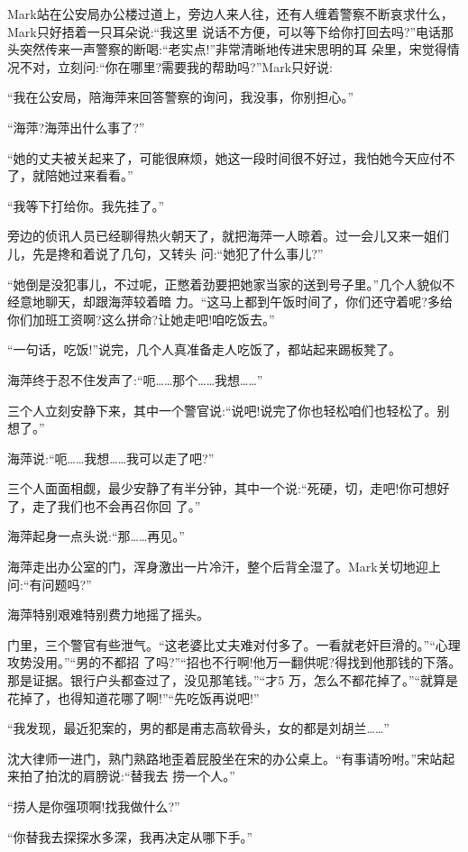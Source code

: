 \documentclass[11pt,a4paper,onecolumn]{article}
\begin{document}
Mark站在公安局办公楼过道上，旁边人来人往，还有人缠着警察不断哀求什么，Mark只好捂着一只耳朵说:``我这里
说话不方便，可以等下给你打回去吗?''电话那头突然传来一声警察的断喝:``老实点!''非常清晰地传进宋思明的耳
朵里，宋觉得情况不对，立刻问:``你在哪里?需要我的帮助吗?''Mark只好说:

``我在公安局，陪海萍来回答警察的询问，我没事，你别担心。''

``海萍?海萍出什么事了?''

``她的丈夫被关起来了，可能很麻烦，她这一段时间很不好过，我怕她今天应付不了，就陪她过来看看。''

``我等下打给你。我先挂了。''

旁边的侦讯人员已经聊得热火朝天了，就把海萍一人晾着。过一会儿又来一姐们儿，先是搀和着说了几句，又转头
问:``她犯了什么事儿?''

``她倒是没犯事儿，不过呢，正憋着劲要把她家当家的送到号子里。''几个人貌似不经意地聊天，却跟海萍较着暗
力。``这马上都到午饭时间了，你们还守着呢?多给你们加班工资啊?这么拼命?让她走吧!咱吃饭去。''

``一句话，吃饭!''说完，几个人真准备走人吃饭了，都站起来踢板凳了。

海萍终于忍不住发声了:``呃……那个……我想……''

三个人立刻安静下来，其中一个警官说:``说吧!说完了你也轻松咱们也轻松了。别想了。''

海萍说:``呃……我想……我可以走了吧?''

三个人面面相觑，最少安静了有半分钟，其中一个说:``死硬，切，走吧!你可想好了，走了我们也不会再召你回
了。''

海萍起身一点头说:``那……再见。''

海萍走出办公室的门，浑身激出一片冷汗，整个后背全湿了。Mark关切地迎上问:``有问题吗?''

海萍特别艰难特别费力地摇了摇头。

门里，三个警官有些泄气。``这老婆比丈夫难对付多了。一看就老奸巨滑的。''``心理攻势没用。''``男的不都招
了吗?''``招也不行啊!他万一翻供呢?得找到他那钱的下落。那是证据。银行户头都查过了，没见那笔钱。''``才5
万，怎么不都花掉了。''``就算是花掉了，也得知道花哪了啊!''``先吃饭再说吧!''

``我发现，最近犯案的，男的都是甫志高软骨头，女的都是刘胡兰……''

沈大律师一进门，熟门熟路地歪着屁股坐在宋的办公桌上。``有事请吩咐。''宋站起来拍了拍沈的肩膀说:``替我去
捞一个人。''

``捞人是你强项啊!找我做什么?''

``你替我去探探水多深，我再决定从哪下手。''
\end{document}

